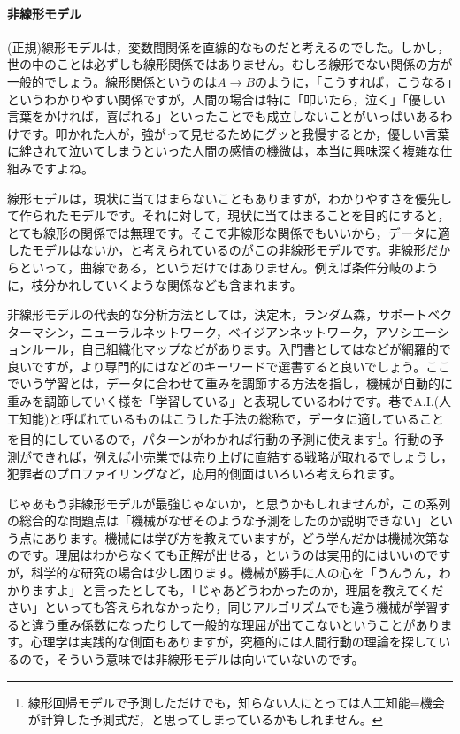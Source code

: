 \documentclass{ltjsbook}
\begin{document}
\paragraph{非線形モデル}
(正規)線形モデルは，変数間関係を直線的なものだと考えるのでした。しかし，世の中のことは必ずしも線形関係ではありません。むしろ線形でない関係の方が一般的でしょう。線形関係というのは$A \to B$のように，「こうすれば，こうなる」というわかりやすい関係ですが，人間の場合は特に「叩いたら，泣く」「優しい言葉をかければ，喜ばれる」といったことでも成立しないことがいっぱいあるわけです。叩かれた人が，強がって見せるためにグッと我慢するとか，優しい言葉に絆されて泣いてしまうといった人間の感情の機微は，本当に興味深く複雑な仕組みですよね。

線形モデルは，現状に当てはまらないこともありますが，わかりやすさを優先して作られたモデルです。それに対して，現状に当てはまることを目的にすると，とても線形の関係では無理です。そこで非線形な関係でもいいから，データに適したモデルはないか，と考えられているのがこの非線形モデルです。非線形だからといって，曲線である，というだけではありません。例えば条件分岐のように，枝分かれしていくような関係なども含まれます。

非線形モデルの代表的な分析方法としては，決定木，ランダム森，サポートベクターマシン，ニューラルネットワーク，ベイジアンネットワーク，アソシエーションルール，自己組織化マップなどがあります。入門書としては\citet{豊田2008}などが網羅的で良いですが，より専門的にはなどのキーワードで選書すると良いでしょう。ここでいう学習とは，データに合わせて重みを調節する方法を指し，機械が自動的に重みを調節していく様を「学習している」と表現しているわけです。巷でA.I.(人工知能)と呼ばれているものはこうした手法の総称で，データに適していることを目的にしているので，パターンがわかれば行動の予測に使えます\footnote{線形回帰モデルで予測しただけでも，知らない人にとっては人工知能=機会が計算した予測式だ，と思ってしまっているかもしれません。}。行動の予測ができれば，例えば小売業では売り上げに直結する戦略が取れるでしょうし，犯罪者のプロファイリングなど，応用的側面はいろいろ考えられます。

じゃあもう非線形モデルが最強じゃないか，と思うかもしれませんが，この系列の総合的な問題点は「機械がなぜそのような予測をしたのか説明できない」という点にあります。機械には学び方を教えていますが，どう学んだかは機械次第なのです。理屈はわからなくても正解が出せる，というのは実用的にはいいのですが，科学的な研究の場合は少し困ります。機械が勝手に人の心を「うんうん，わかりますよ」と言ったとしても，「じゃあどうわかったのか，理屈を教えてください」といっても答えられなかったり，同じアルゴリズムでも違う機械が学習すると違う重み係数になったりして一般的な理屈が出てこないということがあります。心理学は実践的な側面もありますが，究極的には人間行動の理論を探しているので，そういう意味では非線形モデルは向いていないのです。
\end{document}
